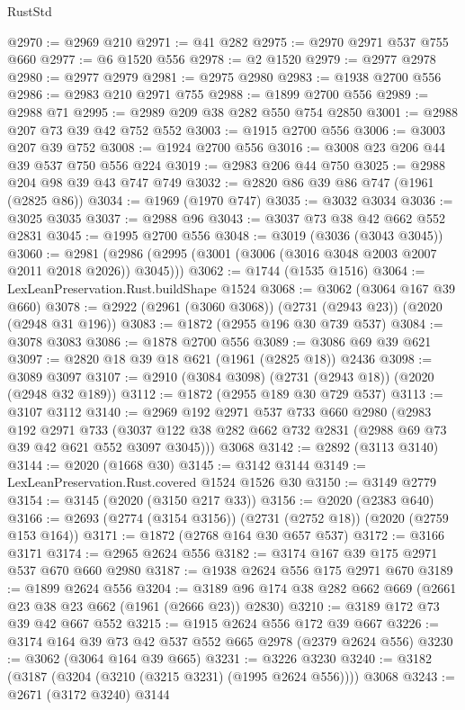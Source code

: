 \begin{lexlean}{RustStd}
\begin{coremodule}
@2970 := @2969 @210
@2971 := @41 @282
@2975 := @2970 @2971 @537 @755 @660
@2977 := @6 @1520 @556
@2978 := @2 @1520
@2979 := @2977 @2978
@2980 := @2977 @2979
@2981 := @2975 @2980
@2983 := @1938 @2700 @556
@2986 := @2983 @210 @2971 @755
@2988 := @1899 @2700 @556
@2989 := @2988 @71
@2995 := @2989 @209 @38 @282 @550 @754 @2850
@3001 := @2988 @207 @73 @39 @42 @752 @552
@3003 := @1915 @2700 @556
@3006 := @3003 @207 @39 @752
@3008 := @1924 @2700 @556
@3016 := @3008 @23 @206 @44 @39 @537 @750 @556 @224
@3019 := @2983 @206 @44 @750
@3025 := @2988 @204 @98 @39 @43 @747 @749
@3032 := @2820 @86 @39 @86 @747 (@1961 (@2825 @86))
@3034 := @1969 (@1970 @747)
@3035 := @3032 @3034
@3036 := @3025 @3035
@3037 := @2988 @96
@3043 := @3037 @73 @38 @42 @662 @552 @2831
@3045 := @1995 @2700 @556
@3048 := @3019 (@3036 (@3043 @3045))
@3060 := @2981 (@2986 (@2995 (@3001 (@3006 (@3016 @3048 @2003 @2007 @2011 @2018 @2026)) @3045)))
@3062 := @1744 (@1535 @1516)
@3064 := LexLeanPreservation.Rust.buildShape @1524
@3068 := @3062 (@3064 @167 @39 @660)
@3078 := @2922 (@2961 (@3060 @3068)) (@2731 (@2943 @23)) (@2020 (@2948 @31 @196))
@3083 := @1872 (@2955 @196 @30 @739 @537)
@3084 := @3078 @3083
@3086 := @1878 @2700 @556
@3089 := @3086 @69 @39 @621
@3097 := @2820 @18 @39 @18 @621 (@1961 (@2825 @18)) @2436
@3098 := @3089 @3097
@3107 := @2910 (@3084 @3098) (@2731 (@2943 @18)) (@2020 (@2948 @32 @189))
@3112 := @1872 (@2955 @189 @30 @729 @537)
@3113 := @3107 @3112
@3140 := @2969
    @192
    @2971
    @537
    @733
    @660
    @2980
    (@2983
      @192
      @2971
      @733
      (@3037 @122 @38 @282 @662 @732 @2831 (@2988 @69 @73 @39 @42 @621 @552 @3097 @3045)))
    @3068
@3142 := @2892 (@3113 @3140)
@3144 := @2020 (@1668 @30)
@3145 := @3142 @3144
@3149 := LexLeanPreservation.Rust.covered @1524 @1526 @30
@3150 := @3149 @2779
@3154 := @3145 (@2020 (@3150 @217 @33))
@3156 := @2020 (@2383 @640)
@3166 := @2693 (@2774 (@3154 @3156)) (@2731 (@2752 @18)) (@2020 (@2759 @153 @164))
@3171 := @1872 (@2768 @164 @30 @657 @537)
@3172 := @3166 @3171
@3174 := @2965 @2624 @556
@3182 := @3174 @167 @39 @175 @2971 @537 @670 @660 @2980
@3187 := @1938 @2624 @556 @175 @2971 @670
@3189 := @1899 @2624 @556
@3204 := @3189 @96 @174 @38 @282 @662 @669 (@2661 @23 @38 @23 @662 (@1961 (@2666 @23)) @2830)
@3210 := @3189 @172 @73 @39 @42 @667 @552
@3215 := @1915 @2624 @556 @172 @39 @667
@3226 := @3174 @164 @39 @73 @42 @537 @552 @665 @2978 (@2379 @2624 @556)
@3230 := @3062 (@3064 @164 @39 @665)
@3231 := @3226 @3230
@3240 := @3182 (@3187 (@3204 (@3210 (@3215 @3231) (@1995 @2624 @556)))) @3068
@3243 := @2671 (@3172 @3240) @3144

\end{coremodule}
\end{lexlean}

